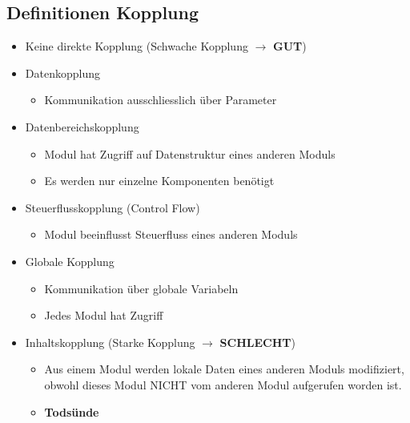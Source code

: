 \begin{multicols}{2}
\subsection{Definitionen Kopplung}
\begin{itemize}
  \item Keine direkte Kopplung (Schwache Kopplung $\rightarrow$ \textbf{GUT})
  \item Datenkopplung
  \begin{itemize}
    \item Kommunikation ausschliesslich über Parameter 
  \end{itemize}
  \item Datenbereichskopplung
   \begin{itemize}
    \item Modul hat Zugriff auf Datenstruktur eines anderen Moduls
    \item Es werden nur einzelne Komponenten benötigt
  \end{itemize}
  \item Steuerflusskopplung (Control Flow)
  \begin{itemize}
    \item Modul beeinflusst Steuerfluss eines anderen Moduls
  \end{itemize}
  \item Globale Kopplung
  \begin{itemize}
    \item Kommunikation über globale Variabeln
    \item Jedes Modul hat Zugriff
  \end{itemize}
  \item Inhaltskopplung (Starke Kopplung $\rightarrow$ \textbf{SCHLECHT})
  \begin{itemize}
    \item Aus einem Modul werden lokale Daten eines anderen Moduls modifiziert,
    obwohl dieses Modul NICHT vom anderen Modul aufgerufen worden ist. 
    \item \textbf{Todsünde}
  \end{itemize}
\end{itemize}
\columnbreak

\end{multicols}

